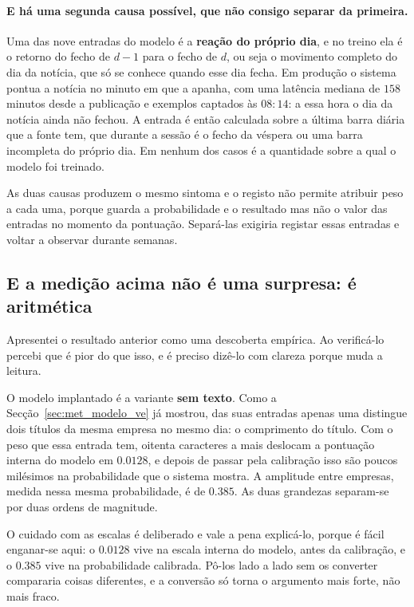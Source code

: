 \paragraph{E há uma segunda causa possível, que não consigo separar da primeira.}
\label{sec:av_ret_event_producao}
Uma das nove entradas do modelo é a \textbf{reação do próprio dia}, e no treino ela é o retorno do
fecho de $d-1$ para o fecho de $d$, ou seja o movimento completo do dia da notícia, que só se
conhece quando esse dia fecha. Em produção o sistema pontua a notícia no minuto em que a apanha,
com uma latência mediana de $158$ minutos desde a publicação e exemplos captados às
$08{:}14$: a essa hora o dia da notícia ainda não fechou. A entrada é então calculada sobre a
última barra diária que a fonte tem, que durante a sessão é o fecho da véspera ou uma barra
incompleta do próprio dia. Em nenhum dos casos é a quantidade sobre a qual o modelo foi treinado.

As duas causas produzem o mesmo sintoma e o registo não permite atribuir peso a cada uma, porque
guarda a probabilidade e o resultado mas não o valor das entradas no momento da pontuação.
Separá-las exigiria registar essas entradas e voltar a observar durante semanas.

\subsection{E a medição acima não é uma surpresa: é aritmética}
\label{sec:av_inevitavel}

Apresentei o resultado anterior como uma descoberta empírica. Ao verificá-lo percebi que é pior do
que isso, e é preciso dizê-lo com clareza porque muda a leitura.

O modelo implantado é a variante \textbf{sem texto}. Como a Secção~\ref{sec:met_modelo_ve} já
mostrou, das suas entradas apenas uma distingue dois títulos da mesma empresa no mesmo dia: o
comprimento do título. Com o peso que essa entrada tem, oitenta caracteres a mais deslocam a
pontuação interna do modelo em $0.0128$, e depois de passar pela calibração isso são poucos
milésimos na probabilidade que o sistema mostra. A amplitude entre empresas, medida nessa mesma
probabilidade, é de $0.385$. As duas grandezas separam-se por duas ordens de magnitude.

O cuidado com as escalas é deliberado e vale a pena explicá-lo, porque é fácil enganar-se aqui: o
$0.0128$ vive na escala interna do modelo, antes da calibração, e o $0.385$ vive na probabilidade
calibrada. Pô-los lado a lado sem os converter compararia coisas diferentes, e a conversão só torna
o argumento mais forte, não mais fraco.

